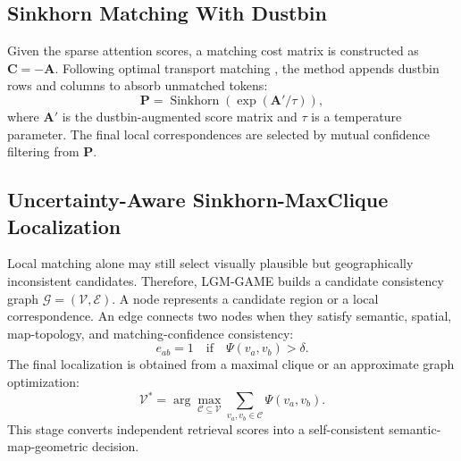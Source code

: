 \documentclass[journal]{IEEEtran}
\begin{document}
\subsection{Sinkhorn Matching With Dustbin}
Given the sparse attention scores, a matching cost matrix is constructed as $\mathbf{C}=-\mathbf{A}$. Following optimal transport matching \cite{sinkhorn1967,superglue2020}, the method appends dustbin rows and columns to absorb unmatched tokens:
\begin{equation}
  \mathbf{P}= \operatorname{Sinkhorn}\left(\exp(\mathbf{A}'/\tau)\right),
\end{equation}
where $\mathbf{A}'$ is the dustbin-augmented score matrix and $\tau$ is a temperature parameter. The final local correspondences are selected by mutual confidence filtering from $\mathbf{P}$.

\subsection{Uncertainty-Aware Sinkhorn-MaxClique Localization}
Local matching alone may still select visually plausible but geographically inconsistent candidates. Therefore, LGM-GAME builds a candidate consistency graph $\mathcal{G}=(\mathcal{V},\mathcal{E})$. A node represents a candidate region or a local correspondence. An edge connects two nodes when they satisfy semantic, spatial, map-topology, and matching-confidence consistency:
\begin{equation}
  e_{ab}=1
  \quad \text{if} \quad
  \Psi(v_a,v_b) > \delta.
\end{equation}
The final localization is obtained from a maximal clique or an approximate graph optimization:
\begin{equation}
  \mathcal{V}^{*} = \arg\max_{\mathcal{C}\subseteq\mathcal{V}}
  \sum_{v_a,v_b\in\mathcal{C}} \Psi(v_a,v_b).
\end{equation}
This stage converts independent retrieval scores into a self-consistent semantic-map-geometric decision.
\end{document}
